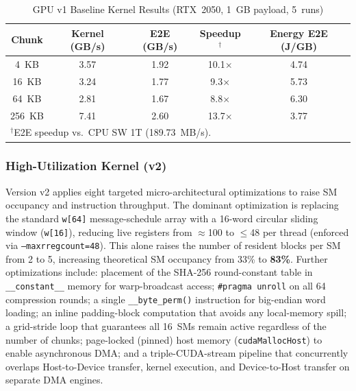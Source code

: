 \documentclass[conference]{IEEEtran}
\begin{document}
\begin{table}[htbp]
  \caption{GPU v1 Baseline Kernel Results (RTX~2050, 1~GB payload, 5~runs)}
  \label{tab:gpu_v1}
  \centering
  \begin{tabular}{ccccc}
    \toprule
    \textbf{Chunk} & \textbf{Kernel (GB/s)} & \textbf{E2E (GB/s)} & \textbf{Speedup$^{\dagger}$} & \textbf{Energy E2E (J/GB)} \\
    \midrule
    4~KB   & 3.57 & 1.92 & 10.1$\times$ & 4.74 \\
    16~KB  & 3.24 & 1.77 & 9.3$\times$  & 5.73 \\
    64~KB  & 2.81 & 1.67 & 8.8$\times$  & 6.30 \\
    256~KB & 7.41 & 2.60 & 13.7$\times$ & 3.77 \\
    \bottomrule
    \multicolumn{5}{l}{\footnotesize $^{\dagger}$E2E speedup vs.\ CPU SW 1T (189.73~MB/s).}
  \end{tabular}
\end{table}

\subsubsection{High-Utilization Kernel (v2)}

Version v2 applies eight targeted micro-architectural optimizations to raise
SM occupancy and instruction throughput.
The dominant optimization is replacing the standard \texttt{w[64]} message-schedule
array with a 16-word circular sliding window (\texttt{w[16]}), reducing live
registers from $\approx$100 to $\leq$48 per thread
(enforced via \texttt{--maxrregcount=48}).
This alone raises the number of resident blocks per SM from 2 to 5,
increasing theoretical SM occupancy from 33\% to \textbf{83\%}.
Further optimizations include: placement of the SHA-256 round-constant table
in \texttt{\_\_constant\_\_} memory for warp-broadcast access;
\texttt{\#pragma~unroll} on all 64 compression rounds;
a single \texttt{\_\_byte\_perm()} instruction for big-endian word loading;
an inline padding-block computation that avoids any local-memory spill;
a grid-stride loop that guarantees all 16~SMs remain active regardless
of the number of chunks; page-locked (pinned) host memory
(\texttt{cudaMallocHost}) to enable asynchronous DMA;
and a triple-CUDA-stream pipeline that concurrently overlaps Host-to-Device
transfer, kernel execution, and Device-to-Host transfer on separate DMA engines.
\end{document}
